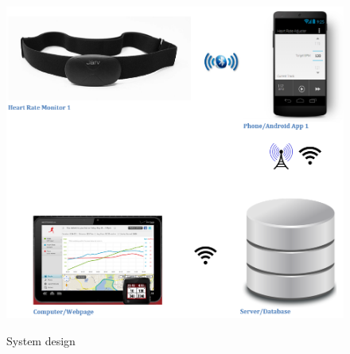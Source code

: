 \documentclass[letterpaper,english, 12pt]{scrreprt}
\begin{document}
\begin{figure}[H]
	\centering
	\includegraphics{img/system_architecture.png}\\
	\caption{System design}
\end{figure}
\end{document}
